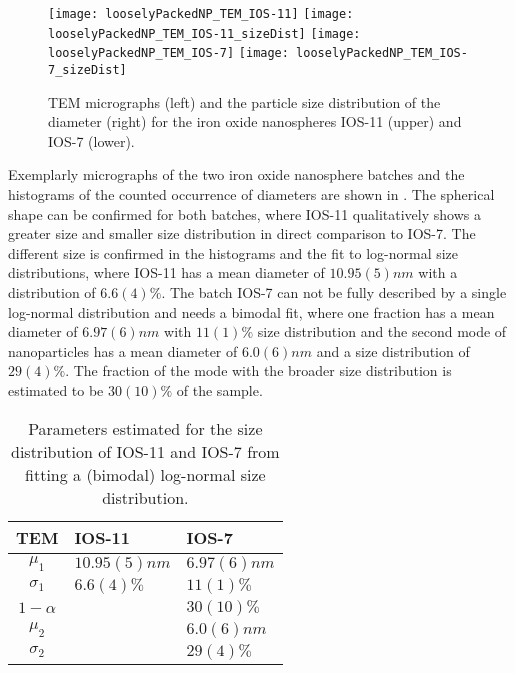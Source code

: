 \documentclass[\main/dresen_thesis.tex]{subfiles}
\begin{document}
  \label{sec:looselyPackedNS:nanoparticle:tem}
  \begin{figure}[!htbp]
    \centering
    \texttt{[image: looselyPackedNP\_TEM\_IOS-11]}
    \texttt{[image: looselyPackedNP\_TEM\_IOS-11\_sizeDist]}
    \texttt{[image: looselyPackedNP\_TEM\_IOS-7]}
    \texttt{[image: looselyPackedNP\_TEM\_IOS-7\_sizeDist]}
    \caption{\label{fig:looselyPackedNP:nanoparticle:tem}TEM micrographs (left) and the particle size distribution of the diameter (right) for the iron oxide nanospheres IOS-11 (upper) and IOS-7 (lower).}
  \end{figure}

  Exemplarly micrographs of the two iron oxide nanosphere batches and the histograms of the counted occurrence of diameters are shown in .
  The spherical shape can be confirmed for both batches, where IOS-11 qualitatively shows a greater size and smaller size distribution in direct comparison to IOS-7.
  The different size is confirmed in the histograms and the fit to log-normal size distributions, where IOS-11 has a mean diameter of $10.95(5) \unit{nm}$ with a distribution of $6.6(4) \%$. 
  The batch IOS-7 can not be fully described by a single log-normal distribution and needs a bimodal fit, where one fraction has a mean diameter of $6.97(6) \unit{nm}$ with $11(1) \%$ size distribution and the second mode of nanoparticles has a mean diameter of $6.0(6) \unit{nm}$ and a size distribution of $29(4) \%$.
  The fraction of the mode with the broader size distribution is estimated to be $30(10) \%$ of the sample.

  \begin{table}[!htbp]
    \centering
    \caption{\label{tab:looselyPackedNP:nanoparticle:temModel}Parameters estimated for the size distribution of IOS-11 and IOS-7 from fitting a (bimodal) log-normal size distribution.}
    \begin{tabular}{ c | l | l }
      \textbf{TEM}  & IOS-11 & IOS-7 \\
      \hline
      $\mu_1$     & $10.95(5) \unit{nm}$  & $6.97(6) \unit{nm}$ \\
      $\sigma_1$  & $6.6(4) \unit{\%}$    & $11(1) \unit{\%}$ \\
      $1 - \alpha$&                       & $30(10)  \unit{\%}$   \\
      $\mu_2$     &                       & $6.0(6) \unit{nm}$ \\
      $\sigma_2$  &                       & $29(4) \unit{\%}$ \\
      \hline
    \end{tabular}
  \end{table}
\end{document}
